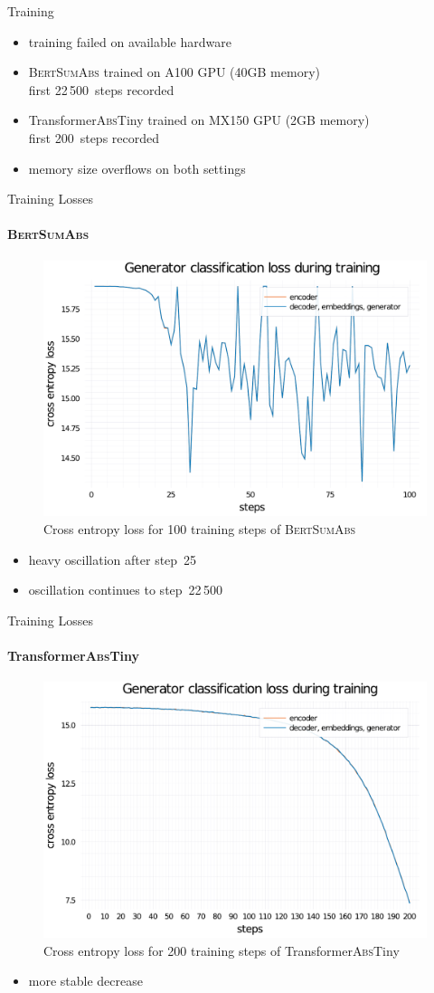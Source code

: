 \documentclass[english,handout]{mlutalk}
\newcommand{\BertSumAbs}{\textsc{BertSumAbs}\xspace}
\newcommand{\TransformerAbsTiny}{Transformer\textsc{Abs}Tiny\xspace}
\begin{document}
\begin{frame}{Training}
    \begin{itemize}
        \item training failed on available hardware
        \item \BertSumAbs trained on A100 GPU (40GB memory) \\ first 22\,500~steps recorded
        \item \TransformerAbsTiny trained on MX150 GPU (2GB memory) \\ first 200~steps recorded
        \item memory size overflows on both settings
    \end{itemize}
\end{frame}

\begin{frame}{Training Losses}
    \framesubtitle{\BertSumAbs}
    \begin{figure}
        \centering
        \includegraphics[width=0.6\linewidth]{figures/training-loss-bert-abs-100.pdf}
        \caption{Cross entropy loss for 100 training steps of \BertSumAbs}
    \end{figure}
    \begin{itemize}
        \item heavy oscillation after step~25
        \item oscillation continues to step~22\,500
    \end{itemize}
\end{frame}

\begin{frame}{Training Losses}
    \framesubtitle{\TransformerAbsTiny}
    \begin{figure}
        \centering
        \includegraphics[width=0.6\linewidth]{figures/training-loss-transformer-abs-tiny.pdf}
        \caption{Cross entropy loss for 200 training steps of \TransformerAbsTiny}
    \end{figure}
    \begin{itemize}
        \item more stable decrease
    \end{itemize}
\end{frame}
\end{document}
